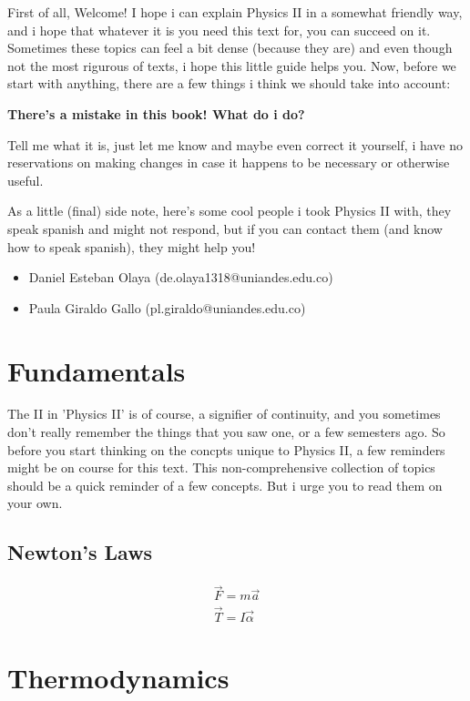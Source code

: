 \documentclass[11pt,fleqn]{book} %
\begin{document}
First of all, Welcome! I hope i can explain Physics II in a somewhat friendly way, and i hope that whatever it is you need this text for, you can succeed on it.
Sometimes these topics can feel a bit dense (because they are) and even though not the most rigurous of texts, i hope this little guide helps you.
Now, before we start with anything, there are a few things i think we should take into account:

\textbf{There's a mistake in this book! What do i do?}

Tell me what it is, just let me know and maybe even correct it yourself, i have
no reservations on making changes in case it happens to be necessary or otherwise useful.

As a little (final) side note, here's some cool people i took Physics II with, they speak spanish and might not respond, but if you can contact them (and know how to speak spanish), they might help you!
\begin{itemize}
    \item Daniel Esteban Olaya (de.olaya1318@uniandes.edu.co)
    \item Paula Giraldo Gallo (pl.giraldo@uniandes.edu.co)
\end{itemize} 

\chapter{Fundamentals}

The II in 'Physics II' is of course, a signifier of continuity, and you sometimes don't really remember the things that you 
saw one, or a few semesters ago. So before you start thinking on the concpts unique to Physics II, a few reminders might be on
course for this text. This non-comprehensive collection of topics should be a quick reminder of a few concepts. But i urge you to 
read them on your own.

\section{Newton's Laws}

\begin{gather}
    \vec{F} = m\vec{a}\\
    \vec{T} = I\vec{\alpha}
\end{gather}

\chapter{Thermodynamics}
\end{document}
